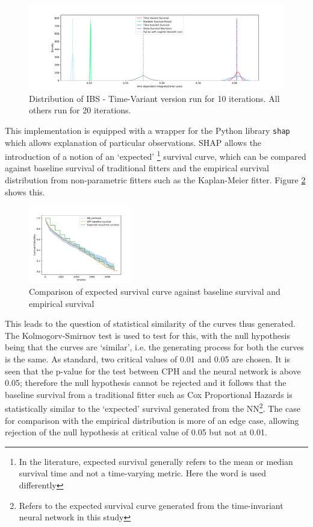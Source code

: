 \documentclass[%
 reprint,
 amsmath,amssymb,
 aps,nofootinbib
]{revtex4-2}
\begin{document}
\begin{figure}
  \centering
  \includegraphics[width=\textwidth]{ibs_score_dist_plot.pdf}
  \caption{Distribution of IBS - Time-Variant version run for 10 iterations. All others run for 20 iterations.}
  \label{fig:ibs}
\end{figure}

This implementation is equipped with a wrapper for the Python library \texttt{shap} which allows explanation of particular observations. SHAP allows the introduction of a notion of an `expected' \footnote{In the literature, expected survival generally refers to the mean or median survival time and not a time-varying metric. Here the word is used differently} survival curve, which can be compared against baseline survival of traditional fitters and the empirical survival distribution from non-parametric fitters such as the Kaplan-Meier fitter. Figure \ref{fig:comparing_surv_curve} shows this.

\begin{figure}[H]
  \centering
  \includegraphics[width=0.4\textwidth]{comparing_surv_curve.pdf}
  \caption{Comparison of expected survival curve against baseline survival and empirical survival}
  \label{fig:comparing_surv_curve}
\end{figure}

This leads to the question of statistical similarity of the curves thus generated. The Kolmogorv-Smirnov test \cite{ks_test_lilliefors} is used to test for this, with the null hypothesis being that the curves are `similar', i.e. the generating process for both the curves is the same. As standard, two critical values of 0.01 and 0.05 are chosen. It is seen that the p-value for the test between CPH and the neural network is above 0.05; therefore the null hypothesis cannot be rejected and it follows that the baseline survival from a traditional fitter such as Cox Proportional Hazards is statistically similar to the `expected' survival generated from the NN\footnote{Refers to the expected survival curve generated from the time-invariant neural network in this study}. The case for comparison with the empirical distribution is more of an edge case, allowing rejection of the null hypothesis at critical value of 0.05 but not at 0.01.\\
\end{document}
